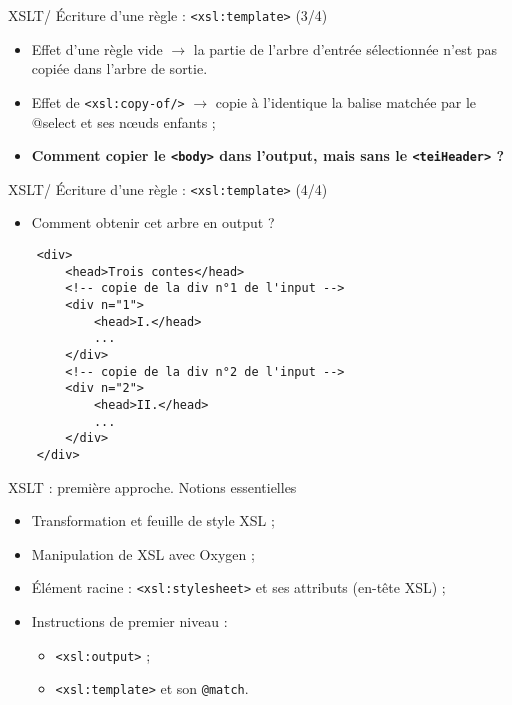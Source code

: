 \documentclass{beamer}
\begin{document}
    \begin{frame}[fragile]{XSLT/ Écriture d'une règle : \texttt{<xsl:template>} (3/4)}
        \Large
        \begin{itemize}
            \item Effet d'une règle vide $\rightarrow$ la partie de l'arbre d'entrée sélectionnée n'est pas copiée dans l'arbre de sortie.
            \bigskip
            \item Effet de \texttt{<xsl:copy-of/>} $\rightarrow$ copie à l'identique la balise matchée par
le @select et ses n\oe uds enfants ;
            \bigskip
            \item \textbf{Comment copier le \texttt{<body>} dans l'output, mais sans le \texttt{<teiHeader>} ?}
        \end{itemize}
    \end{frame}

    \begin{frame}[fragile]{XSLT/ Écriture d'une règle : \texttt{<xsl:template>} (4/4)}
    \Large
        \begin{itemize}
            \item Comment obtenir cet arbre en output ?
        \end{itemize}
        \normalsize
        \begin{verbatim}
    <div>
        <head>Trois contes</head>
        <!-- copie de la div n°1 de l'input -->
        <div n="1">
            <head>I.</head>
            ...
        </div>
        <!-- copie de la div n°2 de l'input -->
        <div n="2">
            <head>II.</head>
            ...
        </div>
    </div>
        \end{verbatim}
        
    \end{frame}

    \begin{frame}{XSLT : première approche. Notions essentielles}
        \Large
        \begin{itemize}
            \item Transformation et feuille de style XSL ;
            \bigskip
            \item Manipulation de XSL avec Oxygen ;
            \bigskip
            \item Élément racine : \texttt{<xsl:stylesheet>} et ses attributs (en-tête XSL) ;
            \bigskip
            \item Instructions de premier niveau :
            \begin{itemize}
            \Large
                \item \texttt{<xsl:output>} ;
                \item \texttt{<xsl:template>} et son \texttt{@match}.
            \end{itemize}
        \end{itemize}
    \end{frame}
\end{document}
